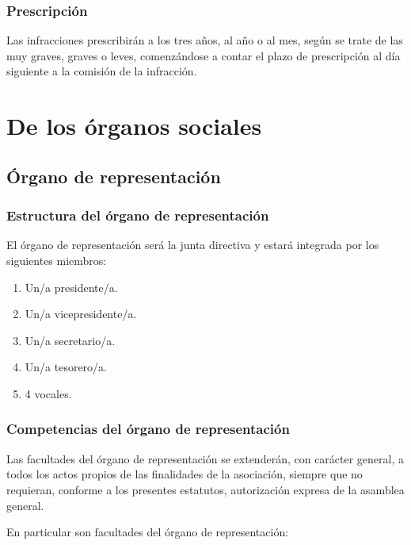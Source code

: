 \documentclass[a4paper, 12pt, oneside]{book}
\begin{document}
\subsection{Prescripción}

Las infracciones prescribirán a los tres años, al año o al mes, según se trate de las muy graves, graves o leves, comenzándose a contar el plazo de prescripción al día siguiente a la comisión de la infracción.

\chapter{De los órganos sociales}

\section{Órgano de representación}

\subsection{Estructura del órgano de representación}

El órgano de representación será la junta directiva y estará integrada por los siguientes miembros:

\begin{enumerate}
    \item Un/a presidente/a.  
    \item Un/a vicepresidente/a.  
    \item Un/a secretario/a.  
    \item Un/a tesorero/a.  
    \item 4 vocales.      
\end{enumerate}

\subsection{Competencias del órgano de representación}

Las facultades del órgano de representación se extenderán, con carácter general, a todos los actos propios de las finalidades de la asociación, siempre que no requieran, conforme a los presentes estatutos, autorización expresa de la asamblea general.

En particular son facultades del órgano de representación:
\end{document}
